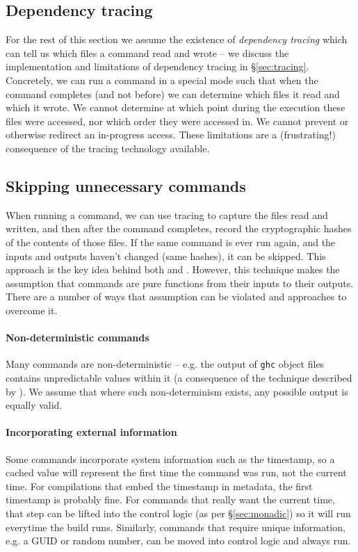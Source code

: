 \subsection{Dependency tracing}
\label{sec:assume_tracing}

For the rest of this section we assume the existence of \emph{dependency tracing} which can tell us which files a command read and wrote -- we discuss the implementation and limitations of dependency tracing in \S\ref{sec:tracing}. Concretely, we can run a command in a special mode such that when the command completes (and not before) we can determine which files it read and which it wrote. We cannot determine at which point during the execution these files were accessed, nor which order they were accessed in. We cannot prevent or otherwise redirect an in-progress access. These limitations are a (frustrating!) consequence of the tracing technology available.

\subsection{Skipping unnecessary commands}
\label{sec:skipping_unnecessary}

When running a command, we can use tracing to capture the files read and written, and then after the command completes, record the cryptographic hashes of the contents of those files. If the same command is ever run again, and the inputs and outputs haven't changed (same hashes), it can be skipped. This approach is the key idea behind both \Memoize\cite{memoize} and \Fabricate\cite{fabricate}. However, this technique makes the assumption that commands are pure functions from their inputs to their outputs. There are a number of ways that assumption can be violated and approaches to overcome it.

\paragraph{Non-deterministic commands} Many commands are non-deterministic -- e.g. the output of \texttt{ghc} object files contains unpredictable values within it (a consequence of the technique described by \citet{lennart:unique_names}). We assume that where such non-determinism exists, any possible output is equally valid.

\paragraph{Incorporating external information} Some commands incorporate system information such as the timestamp, so a cached value will represent the first time the command was run, not the current time. For compilations that embed the timestamp in metadata, the first timestamp is probably fine. For commands that really want the current time, that step can be lifted into the control logic (as per \S\ref{sec:monadic}) so it will run everytime the build runs. Similarly, commands that require unique information, e.g. a GUID or random number, can be moved into control logic and always run.

